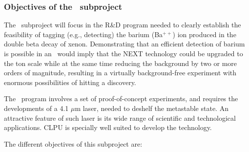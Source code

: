 %

\subsubsection*{Objectives of the \BATA\ subproject}
The \BATA\ subproject will focus in the R\&D program needed to clearly establish the feasibility of tagging (e.g., detecting) the barium (Ba$^{++}$) ion produced in the double beta decay of xenon. Demonstrating that an efficient detection of barium is possible in an \HPXE\ would imply that the NEXT technology could be upgraded to the ton scale while at the same time reducing the background by two or more orders of magnitude, resulting in a virtually background-free experiment with enormous possibilities of hitting a discovery. 

The \BATA\ program involves a set of proof-of-concept experiments, and requires the developments of a 4.1 $\mu$m laser, needed to deshelf the metastable state. An attractive feature of such laser is its wide range of scientific and technological applications. CLPU is specially well suited to develop the technology.

The different objectives of this subproject are:

